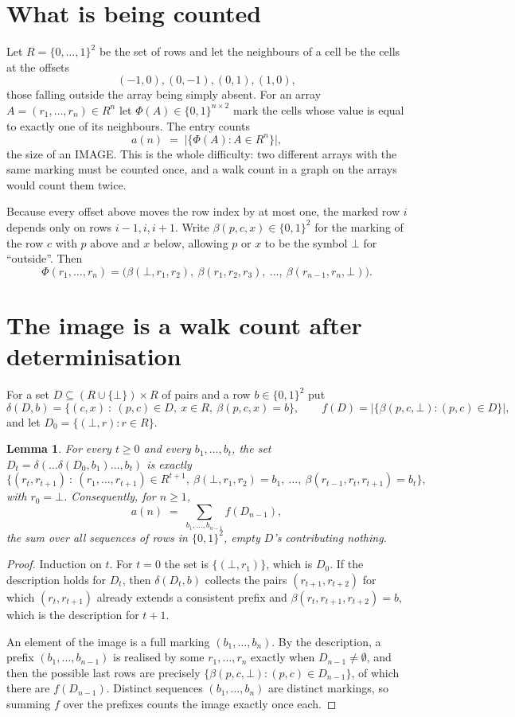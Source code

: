 \documentclass[11pt,a4paper]{article}
\theoremstyle{plain}
\newtheorem{lemma}[theorem]{Lemma}
\theoremstyle{definition}
\begin{document}
\section{What is being counted}

Let $R=\{0,\dots,1\}^{2}$ be the set of rows and let the neighbours of a cell be the
cells at the offsets
\[
(-1,0), (0,-1), (0,1), (1,0),
\]
those falling outside the array being simply absent. For an array
$A=(r_1,\dots,r_n)\in R^n$ let $\Phi(A)\in\{0,1\}^{n\times2}$ mark the cells whose value
is equal to exactly one of its neighbours. The entry counts
\[
a(n)\;=\;\bigl|\{\Phi(A):A\in R^n\}\bigr| ,
\]
the size of an IMAGE. This is the whole difficulty: two different arrays with the same marking
must be counted once, and a walk count in a graph on the arrays would count them twice.

Because every offset above moves the row index by at most one, the marked row $i$ depends only
on rows $i-1,i,i+1$. Write $\beta(p,c,x)\in\{0,1\}^{2}$ for the marking of the row $c$
with $p$ above and $x$ below, allowing $p$ or $x$ to be the symbol $\bot$ for ``outside''.
Then
\[
\Phi(r_1,\dots,r_n)=\bigl(\beta(\bot,r_1,r_2),\ \beta(r_1,r_2,r_3),\ \dots,\
\beta(r_{n-1},r_n,\bot)\bigr).
\]

\section{The image is a walk count after determinisation}

For a set $D\subseteq(R\cup\{\bot\})\times R$ of pairs and a row $b\in\{0,1\}^{2}$ put
\[
\delta(D,b)=\{(c,x)\ :\ (p,c)\in D,\ x\in R,\ \beta(p,c,x)=b\},\qquad
f(D)=\bigl|\{\beta(p,c,\bot):(p,c)\in D\}\bigr| ,
\]
and let $D_0=\{(\bot,r):r\in R\}$.

\begin{lemma}\label{lem:det}
For every $t\ge0$ and every $b_1,\dots,b_t$, the set
$D_t=\delta(\dots\delta(D_0,b_1)\dots,b_t)$ is exactly
\[
\{(r_t,r_{t+1})\ :\ (r_1,\dots,r_{t+1})\in R^{t+1},\ \beta(\bot,r_1,r_2)=b_1,\ \dots,\
\beta(r_{t-1},r_t,r_{t+1})=b_t\} ,
\]
with $r_0=\bot$. Consequently, for $n\ge1$,
\[
a(n)\;=\;\sum_{b_1,\dots,b_{n-1}}f(D_{n-1}),
\]
the sum over all sequences of rows in $\{0,1\}^{2}$, empty $D$'s contributing nothing.
\end{lemma}

\begin{proof}
Induction on $t$. For $t=0$ the set is $\{(\bot,r_1)\}$, which is $D_0$. If the description
holds for $D_t$, then $\delta(D_t,b)$ collects the pairs $(r_{t+1},r_{t+2})$ for which
$(r_t,r_{t+1})$ already extends a consistent prefix and
$\beta(r_t,r_{t+1},r_{t+2})=b$, which is the description for $t+1$.

An element of the image is a full marking $(b_1,\dots,b_n)$. By the description, a prefix
$(b_1,\dots,b_{n-1})$ is realised by some $r_1,\dots,r_n$ exactly when $D_{n-1}\neq
\emptyset$, and then the possible last rows are precisely
$\{\beta(p,c,\bot):(p,c)\in D_{n-1}\}$, of which there are $f(D_{n-1})$. Distinct
sequences $(b_1,\dots,b_n)$ are distinct markings, so summing $f$ over the prefixes counts the
image exactly once each.
\end{proof}
\end{document}
